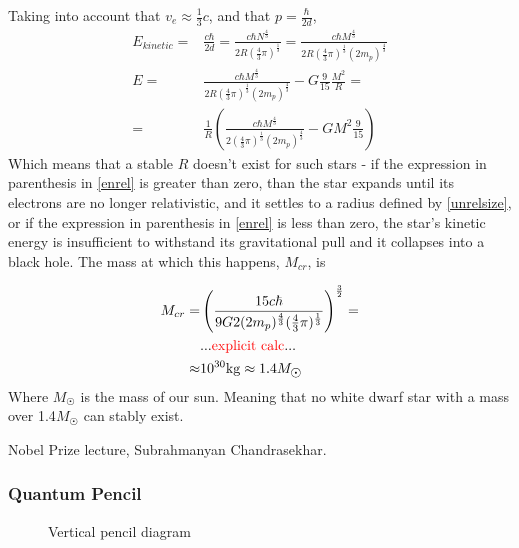 			Taking into account that $v_e \approx \frac{1}{3}c$, and that $p = \frac{\hbar}{2d}$,
			\begin{align}
				E_{kinetic} =& \frac{c\hbar}{2d} = \frac{c\hbar N^{\frac{4}{3}}}{2 R (\frac{4}{3}\pi)^{\frac{1}{3}}} = \frac{c \hbar M^{\frac{4}{3}}}{2 R (\frac{4}{3}\pi)^{\frac{1}{3}}(2m_p)^{\frac{4}{3}}} \\
				E =& \frac{c \hbar M^{\frac{4}{3}}}{2 R (\frac{4}{3}\pi)^{\frac{1}{3}}(2m_p)^{\frac{4}{3}}} -G \frac{9}{15} \frac{M^2}{R}  =\\
				=& \frac{1}{R}(\frac{c \hbar M^{\frac{4}{3}}}{2 (\frac{4}{3}\pi)^{\frac{1}{3}}(2m_p)^{\frac{4}{3}}} -G M^2 \frac{9}{15}) \label{enrel}
			\end{align}
			Which means that a stable $R$ doesn't exist for such stars - if the expression in parenthesis in \ref{enrel} is greater than zero, than the star expands until its electrons are no longer relativistic, and it settles to a radius defined by \ref{unrelsize}, or if the expression in parenthesis in \ref{enrel} is less than zero, the star's kinetic energy is insufficient to withstand its gravitational pull and it collapses into a black hole.
			The mass at which this happens, $M_{cr}$, is
			
			\begin{align}
				M_{cr} =& \left( \frac{15 c \hbar}{9 G 2(2m_p)^{\frac{4}{3}}(\frac{4}{3} \pi)^{\frac{1}{3}}} \right)^{\frac{3}{2}} = \\
				&... \hl{\text{explicit calc}} ... \nonumber\\ 
				\approx& 10^{30} \si{kg} \approx 1.4 M_{\astrosun}
			\end{align} 
			Where $M_{\astrosun}$ is the mass of our sun. Meaning that no white dwarf star with a mass over 1.4$M_{\astrosun}$ can stably exist.
			
			Nobel Prize lecture, Subrahmanyan Chandrasekhar\cite{chandrasekhar1984stars}.
		\subsubsection{Quantum Pencil}
			\begin{figure}[!h]
				\centering
				
				\caption{Vertical pencil diagram}
				\label{pencil}
			\end{figure}
			
